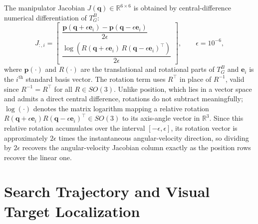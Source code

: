 The manipulator Jacobian $J(\mathbf{q}) \in \mathbb{R}^{6\times 6}$ is obtained by central-difference
numerical differentiation of $T^{B}_{G}$:
\begin{equation}
J_{:,i} =
\begin{bmatrix}
\dfrac{\mathbf{p}(\mathbf{q}+\epsilon\mathbf{e}_i) - \mathbf{p}(\mathbf{q}-\epsilon\mathbf{e}_i)}{2\epsilon} \\[1.2ex]
\dfrac{\log\!\left( R(\mathbf{q}+\epsilon\mathbf{e}_i)\, R(\mathbf{q}-\epsilon\mathbf{e}_i)^\top \right)}{2\epsilon}
\end{bmatrix}, \qquad \epsilon = 10^{-6},
\label{eq:sv_jacobian}
\end{equation}
where $\mathbf{p}(\cdot)$ and $R(\cdot)$ are the translational and rotational parts of $T^{B}_{G}$
and $\mathbf{e}_i$ is the $i^{\text{th}}$ standard basis vector. The rotation term uses $R^\top$ in
place of $R^{-1}$, valid since $R^{-1} = R^\top$ for all $R \in SO(3)$. Unlike position, which lies
in a vector space and admits a direct central difference, rotations do not subtract meaningfully;
$\log(\cdot)$ denotes the matrix logarithm mapping a relative rotation
$R(\mathbf{q}+\epsilon\mathbf{e}_i)R(\mathbf{q}-\epsilon\mathbf{e}_i)^\top \in SO(3)$ to its
axis-angle vector in $\mathbb{R}^3$. Since this relative rotation accumulates over the interval
$[-\epsilon, \epsilon]$, its rotation vector is approximately $2\epsilon$ times the instantaneous
angular-velocity direction, so dividing by $2\epsilon$ recovers the angular-velocity Jacobian column
exactly as the position rows recover the linear one.

\section{Search Trajectory and Visual Target Localization}\label{sec:sv_search}

